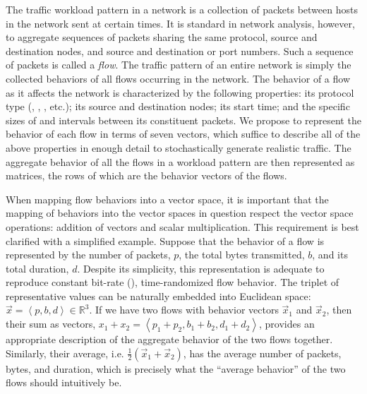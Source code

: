 \documentclass[twocolumn,final]{svjour3}
\newcommand{\caps}[1]{{\smaller{#1}}}
\newcommand{\R}{\mathbb{R}}
\newcommand{\seq}[1]{\left<#1\right>}
\begin{document}
The traffic workload pattern in a network is a collection of \caps{IP} packets between hosts in the network sent at certain times. It is standard in network analysis, however, to aggregate sequences of packets sharing the same \caps{IP} protocol, source and destination nodes, and source and destination \caps{TCP} or \caps{UDP} port numbers. Such a sequence of packets is called a \textit{flow}. The traffic pattern of an entire network is simply the collected behaviors of all flows occurring in the network. The behavior of a flow as it affects the network is characterized by the following properties: its \caps{IP} protocol type (\caps{TCP}, \caps{UDP}, \caps{ICMP}, etc.); its source and destination nodes; its start time; and the specific sizes of and intervals between its constituent packets. We propose to represent the behavior of each flow in terms of seven vectors, which suffice to describe all of the above properties in enough detail to stochastically generate realistic traffic. The aggregate behavior of all the flows in a workload pattern are then represented as matrices, the rows of which are the behavior vectors of the flows.

When mapping flow behaviors into a vector space, it is important that the mapping of behaviors into the vector spaces in question respect the vector space operations: addition of vectors and scalar multiplication. This requirement is best clarified with a simplified example. Suppose that the behavior of a flow is represented by the number of packets, $p$, the total bytes transmitted, $b$, and its total duration, $d$. Despite its simplicity, this representation is adequate to reproduce constant bit-rate (\caps{CBR}), time-randomized flow behavior. The triplet of representative values can be naturally embedded into Euclidean space: $\vec{x}=\seq{p,b,d}\in\R^3$. If we have two flows with behavior vectors $\vec{x}_1$ and $\vec{x}_2$, then their sum as vectors, $x_1+x_2=\seq{p_1+p_2,b_1+b_2,d_1+d_2}$, provides an appropriate description of the aggregate behavior of the two flows together. Similarly, their average, i.e. $\frac{1}{2}(\vec{x}_1+\vec{x}_2)$, has the average number of packets, bytes, and duration, which is precisely what the ``average behavior'' of the two flows should intuitively be.

\end{document}
